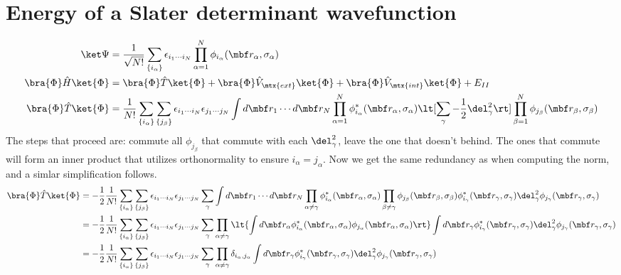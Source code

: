 \documentclass[10pt]{article}
\begin{document}
\section{\label{sec:slegy} Energy of a Slater determinant wavefunction}
  \begin{align*}
    \ket \Psi
    &=
    \frac{1}{\sqrt{N!}} 
    \sum_{\{i_\alpha\}}
    \epsilon_{i_1 \cdots i_N}
    \prod_{\alpha=1}^N \phi_{i_\alpha}(\mbf r_\alpha, \sigma_\alpha)
    \\
    \bra{\Phi} \hat H \ket{\Phi}
    &=
    \bra{\Phi} \hat T \ket{\Phi}
    +
    \bra{\Phi} \hat V_\mtx{ext} \ket{\Phi}
    +
    \bra{\Phi} \hat V_\mtx{int} \ket{\Phi}
    +
    E_{II}
    \\
    \bra{\Phi} \hat T \ket{\Phi}
    &=
    \frac{1}{N!} \sum_{\{i_\alpha\}} \sum_{\{j_\beta\}}
    \epsilon_{i_1 \cdots i_N} \epsilon_{j_1 \cdots j_N}
    \int d\mbf r_1 \cdots d\mbf r_N
    \prod_{\alpha=1}^N \phi_{i_\alpha}^*(\mbf r_\alpha, \sigma_\alpha)
    \lt[\sum_\gamma -\frac12 \del_\gamma^2 \rt]
    \prod_{\beta=1}^N \phi_{j_\beta}(\mbf r_\beta, \sigma_\beta)
    \\
  \end{align*}
  The steps that proceed are: commute all $\phi_{j_\beta}$ that commute with each
  $\del_\gamma^2$, leave the one that doesn't behind. The ones that commute will
  form an inner product that utilizes orthonormality to ensure $i_\alpha =
  j_{\alpha}$. Now we get the same redundancy as when computing the norm, and a
  simlar simplification follows.
  \begin{align*}
    \bra{\Phi} \hat T \ket{\Phi}
    &=
    -\frac12 
    \frac{1}{N!} \sum_{\{i_\alpha\}} \sum_{\{j_\beta\}}
    \epsilon_{i_1 \cdots i_N} \epsilon_{j_1 \cdots j_N}
    \sum_\gamma
    \int d\mbf r_1 \cdots d\mbf r_N
    \prod_{\alpha \ne \gamma} \phi_{i_\alpha}^*(\mbf r_\alpha, \sigma_\alpha)
    \prod_{\beta \ne \gamma} \phi_{j_\beta}(\mbf r_\beta, \sigma_\beta)
    \phi_{i_\gamma}^*(\mbf r_\gamma, \sigma_\gamma)
    \del_\gamma^2 \phi_{j_\gamma}(\mbf r_\gamma, \sigma_\gamma)
    \\
    &=
    -\frac12 
    \frac{1}{N!} \sum_{\{i_\alpha\}} \sum_{\{j_\beta\}}
    \epsilon_{i_1 \cdots i_N} \epsilon_{j_1 \cdots j_N}
    \sum_\gamma
    \prod_{\alpha \ne \gamma}
    \lt\{
    \int d\mbf r_\alpha 
      \phi_{i_\alpha}^*(\mbf r_\alpha, \sigma_\alpha)
      \phi_{j_\alpha}(\mbf r_\alpha, \sigma_\alpha)
    \rt\}
    \int d\mbf r_\gamma
    \phi_{i_\gamma}^*(\mbf r_\gamma, \sigma_\gamma)
    \del_\gamma^2 \phi_{j_\gamma}(\mbf r_\gamma, \sigma_\gamma)
    \\
    &=
    -\frac12 
    \frac{1}{N!} \sum_{\{i_\alpha\}} \sum_{\{j_\beta\}}
    \epsilon_{i_1 \cdots i_N} \epsilon_{j_1 \cdots j_N}
    \sum_\gamma
    \prod_{\alpha \ne \gamma}
    \delta_{i_\alpha,j_\alpha}
    \int d\mbf r_\gamma
    \phi_{i_\gamma}^*(\mbf r_\gamma, \sigma_\gamma)
    \del_\gamma^2 \phi_{j_\gamma}(\mbf r_\gamma, \sigma_\gamma)
  \end{align*}
\end{document}
